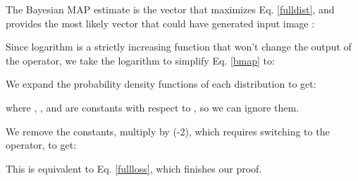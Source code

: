 \documentclass{article}
\begin{document}
The Bayesian MAP estimate is the vector  that maximizes Eq. \ref{fulldist}, and provides the most likely vector  that could have generated input image :




Since logarithm is a strictly increasing function that won't change the output of the  operator, we take the logarithm to simplify Eq. \ref{bmap} to:



We expand the probability density functions of each distribution to get:




where , ,  and  are constants with respect to , so we can ignore them. 

We remove the constants, multiply by (-2), which requires switching to the  operator, to get:



This is equivalent to Eq. \ref{fullloss}, which finishes our proof. 
\end{document}
